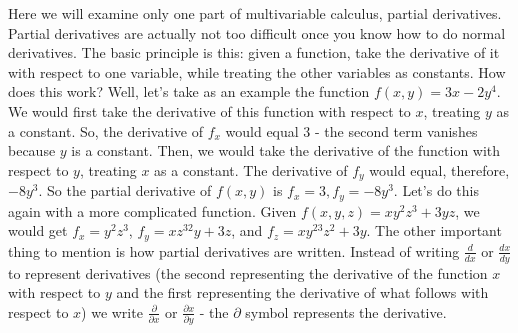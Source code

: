 Here we will examine only one part of multivariable calculus, partial derivatives.
Partial derivatives are actually not too difficult once you know how to do normal derivatives.
The basic principle is this: given a function, take the derivative of it with respect to one variable, while treating the other variables as constants.
How does this work? Well, let's take as an example the function $f(x,y)=3x-2y^4$.
We would first take the derivative of this function with respect to $x$, treating $y$ as a constant. 
So, the derivative of $f_x$ would equal $3$ - the second term vanishes because $y$ is a constant. 
Then, we would take the derivative of the function with respect to $y$, treating $x$ as a constant.
The derivative of $f_y$ would equal, therefore, $-8y^3$. 
So the partial derivative of $f(x,y)$ is $f_x=3, f_y=-8y^3$.
Let's do this again with a more complicated function. Given $f(x,y,z)=xy^2z^3+3yz$, we would get $f_x=y^2z^3$, $f_y=xz^32y+3z$, and $f_z=xy^23z^2+3y$.
The other important thing to mention is how partial derivatives are written. Instead of writing $\frac{d}{dx}$ or $\frac{dx}{dy}$ to represent derivatives (the second representing the derivative of the function $x$ with respect to $y$ and the first representing the derivative of what follows with respect to $x$) we write $\frac{\partial}{\partial x}$ or $\frac{\partial x}{\partial y}$ - the $\partial$ symbol represents the derivative.